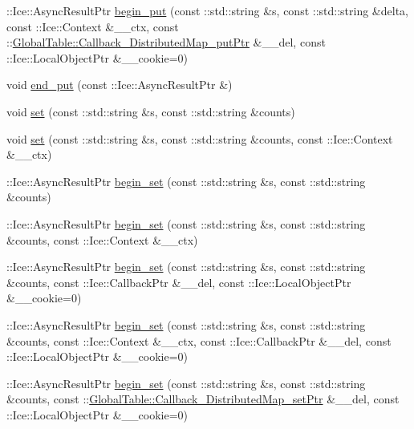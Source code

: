 \begin{DoxyCompactItemize}
\item 
::Ice::AsyncResultPtr \hyperlink{class_ice_proxy_1_1_global_table_1_1_distributed_map_a0d93f9200764c50d0aa60d78efa36cd2}{begin\_\-put} (const ::std::string \&s, const ::std::string \&delta, const ::Ice::Context \&\_\-\_\-ctx, const ::\hyperlink{namespace_global_table_a652e5fcf9acdfd0d854019d109b9644a}{GlobalTable::Callback\_\-DistributedMap\_\-putPtr} \&\_\-\_\-del, const ::Ice::LocalObjectPtr \&\_\-\_\-cookie=0)
\item 
void \hyperlink{class_ice_proxy_1_1_global_table_1_1_distributed_map_af82dc5733e3aa14b2b29368475609a74}{end\_\-put} (const ::Ice::AsyncResultPtr \&)
\item 
void \hyperlink{class_ice_proxy_1_1_global_table_1_1_distributed_map_a59fbe9ec6ba1b8004941d792cf858c9d}{set} (const ::std::string \&s, const ::std::string \&counts)
\item 
void \hyperlink{class_ice_proxy_1_1_global_table_1_1_distributed_map_a7c9e7642cc48a4a0092d18533cd1ef14}{set} (const ::std::string \&s, const ::std::string \&counts, const ::Ice::Context \&\_\-\_\-ctx)
\item 
::Ice::AsyncResultPtr \hyperlink{class_ice_proxy_1_1_global_table_1_1_distributed_map_a362f376d77d5638e940aecc543faf8f3}{begin\_\-set} (const ::std::string \&s, const ::std::string \&counts)
\item 
::Ice::AsyncResultPtr \hyperlink{class_ice_proxy_1_1_global_table_1_1_distributed_map_a8cf9350ce04066ef0e71ce691d633527}{begin\_\-set} (const ::std::string \&s, const ::std::string \&counts, const ::Ice::Context \&\_\-\_\-ctx)
\item 
::Ice::AsyncResultPtr \hyperlink{class_ice_proxy_1_1_global_table_1_1_distributed_map_aa56a333211b056d38326aa5e23c71fac}{begin\_\-set} (const ::std::string \&s, const ::std::string \&counts, const ::Ice::CallbackPtr \&\_\-\_\-del, const ::Ice::LocalObjectPtr \&\_\-\_\-cookie=0)
\item 
::Ice::AsyncResultPtr \hyperlink{class_ice_proxy_1_1_global_table_1_1_distributed_map_ab88395a8799499c022f1edc1ac499de3}{begin\_\-set} (const ::std::string \&s, const ::std::string \&counts, const ::Ice::Context \&\_\-\_\-ctx, const ::Ice::CallbackPtr \&\_\-\_\-del, const ::Ice::LocalObjectPtr \&\_\-\_\-cookie=0)
\item 
::Ice::AsyncResultPtr \hyperlink{class_ice_proxy_1_1_global_table_1_1_distributed_map_a87695c97a97a3ed2d436d81da7452006}{begin\_\-set} (const ::std::string \&s, const ::std::string \&counts, const ::\hyperlink{namespace_global_table_a8196b91ca3241e16fd9aac727da95e02}{GlobalTable::Callback\_\-DistributedMap\_\-setPtr} \&\_\-\_\-del, const ::Ice::LocalObjectPtr \&\_\-\_\-cookie=0)

\end{DoxyCompactItemize}

